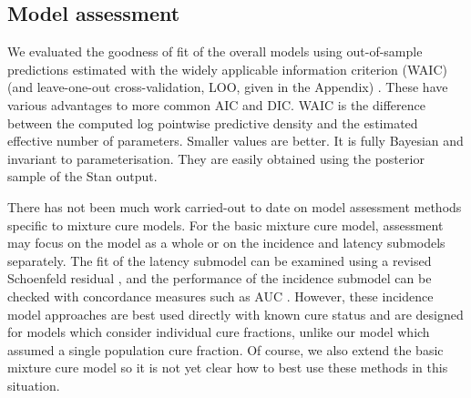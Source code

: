 \documentclass[AMA,STIX1COL]{WileyNJD-v2}
\begin{document}
%
\subsection{Model assessment}
We evaluated the goodness of fit of the overall models using out-of-sample predictions estimated with the widely applicable information criterion (WAIC) (and leave-one-out cross-validation, LOO, given in the Appendix) \cite{Vehtari2017}. These have various advantages to more common AIC and DIC. WAIC is the difference between the computed log pointwise predictive density and the estimated effective number of parameters. Smaller values are better. It is fully Bayesian and invariant to parameterisation. They are easily obtained using the posterior sample of the Stan output.
%



There has not been much work carried-out to date on model assessment methods specific to mixture cure models.
For the basic mixture cure model, assessment may focus on the model as a whole or on the incidence and latency submodels separately.
The fit of the latency submodel can be examined using a revised Schoenfeld residual \cite{Wileyto2013}, and the performance of the incidence submodel can be checked with concordance measures such as AUC \cite{Peng2021}.
However, these incidence model approaches are best used directly with known cure status and are designed for models which consider individual cure fractions, unlike our model which assumed a single population cure fraction.
Of course, we also extend the basic mixture cure model so it is not yet clear how to best use these methods in this situation. 
\end{document}
